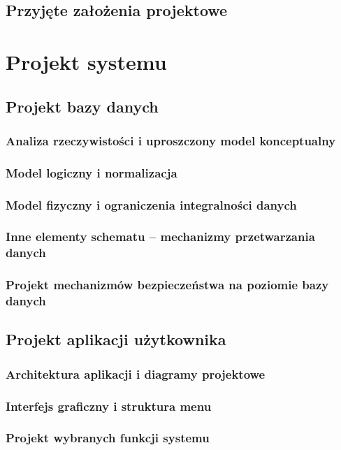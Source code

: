 \documentclass[a4paper, 12pt]{article}
\begin{document}
\subsection{Przyjęte założenia projektowe}

\section{Projekt systemu}
\subsection{Projekt bazy danych}
\subsubsection{Analiza rzeczywistości i uproszczony model konceptualny}
\subsubsection{Model logiczny i normalizacja}
\subsubsection{Model fizyczny i ograniczenia integralności danych}
\subsubsection{Inne elementy schematu – mechanizmy przetwarzania danych}
\subsubsection{Projekt mechanizmów bezpieczeństwa na poziomie bazy danych}

\subsection{Projekt aplikacji użytkownika}
\subsubsection{Architektura aplikacji i diagramy projektowe}
\subsubsection{Interfejs graficzny i struktura menu}
\subsubsection{Projekt wybranych funkcji systemu}
\end{document}
